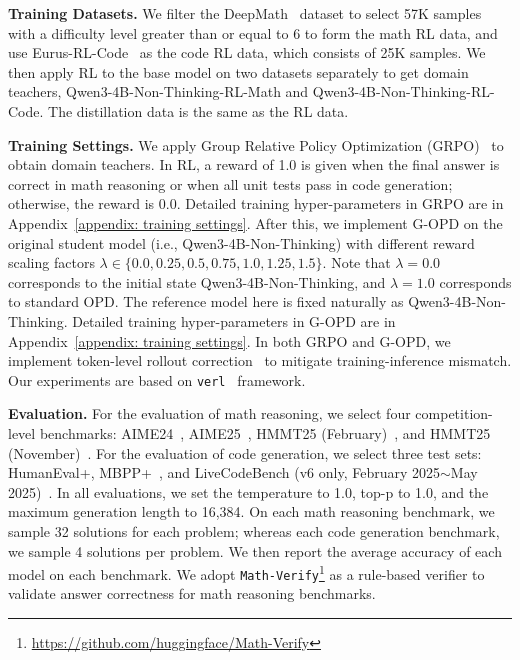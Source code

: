 \documentclass{article} %
\begin{document}
\textbf{Training Datasets.} We filter the DeepMath~\citep{deepmath} dataset to select 57K samples with a difficulty level greater than or equal to 6 to form the math RL data, and use Eurus-RL-Code~\citep{prime} as the code RL data, which consists of 25K samples. We then apply RL to the base model on two datasets separately to get domain teachers, Qwen3-4B-Non-Thinking-RL-Math and Qwen3-4B-Non-Thinking-RL-Code. The distillation data is the same as the RL data.

\textbf{Training Settings.} We apply Group Relative Policy Optimization (GRPO)~\citep{deepseekmath} to obtain domain teachers. In RL, a reward of 1.0 is given when the final answer is correct in math reasoning or when all unit tests pass in code generation; otherwise, the reward is 0.0. Detailed training hyper-parameters in GRPO are in Appendix~\ref{appendix: training settings}. After this, we implement G-OPD on the original student model (i.e., Qwen3-4B-Non-Thinking) with different reward scaling factors $\lambda \in \{0.0, 0.25, 0.5, 0.75, 1.0, 1.25, 1.5\}$. Note that $\lambda=0.0$ corresponds to the initial state Qwen3-4B-Non-Thinking, and $\lambda=1.0$ corresponds to standard OPD. The reference model here is fixed naturally as Qwen3-4B-Non-Thinking. Detailed training hyper-parameters in G-OPD are in Appendix~\ref{appendix: training settings}. In both GRPO and G-OPD, we implement token-level rollout correction~\citep{rollout-correction} to mitigate training-inference mismatch. Our experiments are based on \texttt{verl}~\citep{verl} framework.

\textbf{Evaluation.} For the evaluation of math reasoning, we select four competition-level benchmarks: AIME24~\citep{aime2024}, AIME25~\citep{aime2025}, HMMT25 (February)~\citep{hmmt25}, and HMMT25 (November)~\citep{hmmt25}. For the evaluation of code generation, we select three test sets: HumanEval+, MBPP+~\citep{evalplus}, and LiveCodeBench (v6 only, February 2025$\sim$May 2025)~\citep{lcb}. In all evaluations, we set the temperature to 1.0, top-p to 1.0, and the maximum generation length to 16,384. 
On each math reasoning benchmark, we sample 32 solutions for each problem; whereas each code generation benchmark, we sample 4 solutions per problem. We then report the average accuracy of each model on each benchmark. We adopt \texttt{Math-Verify}\footnote{\url{https://github.com/huggingface/Math-Verify}} as a rule-based verifier to validate answer correctness for math reasoning benchmarks.
\end{document}
